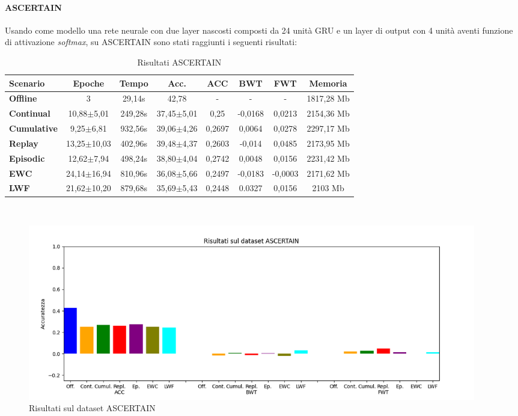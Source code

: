 \paragraph{ASCERTAIN} Usando come modello una rete neurale con due layer nascosti composti da 24 unità GRU e un layer di output con 4 unità aventi funzione di attivazione \textit{softmax}, su ASCERTAIN sono stati raggiunti i seguenti risultati:
\begin{table}[h]
\footnotesize
    \begin{tabular}{l|c|c|c|c|c|c|c}
        \textbf{Scenario} & \textbf{Epoche} & \textbf{Tempo} & \textbf{Acc.} & \textbf{ACC} & \textbf{BWT} & \textbf{FWT} & \textbf{Memoria}\\
        \hline
         \textbf{Offline} & 3 & 29,14s & 42,78 & - & - & - & 1817,28 Mb\\
        \textbf{Continual} & 10,88$\pm$5,01 & 249,28s & 37,45$\pm$5,01 & 0,25 & -0,0168 & 0,0213 & 2154,36 Mb\\
        \textbf{Cumulative} & 9,25$\pm$6,81 & 932,56s & 39,06$\pm$4,26 & 0,2697 & 0,0064 & 0,0278 & 2297,17 Mb\\
        \textbf{Replay} & 13,25$\pm$10,03 & 402,96s & 39,48$\pm$4,37 & 0,2603 & -0,014 & 0,0485 & 2173,95 Mb\\
        \textbf{Episodic} & 12,62$\pm$7,94 & 498,24s & 38,80$\pm$4,04 & 0,2742 & 0,0048 & 0,0156 & 2231,42 Mb\\
        \textbf{EWC} & 24,14$\pm$16,94 & 810,96s & 36,08$\pm$5,66 & 0,2497 & -0,0183 & -0,0003 & 2171,62 Mb\\
        \textbf{LWF} & 21,62$\pm$10,20 & 879,68s & 35,69$\pm$5,43 & 0,2448 & 0.0327 & 0,0156 & 2103 Mb\\
    \end{tabular}
    \caption{Risultati ASCERTAIN}
    \label{tab:resascertain}
\end{table}\\
\begin{figure}[h]
	\begin{center}
		\includegraphics[width=0.95\textwidth]{img/graphs/ascertain_final_metrics.png}
		\caption{Risultati sul dataset ASCERTAIN}
		\label{fig:ascertain_metrics_graph}
	\end{center}
\end{figure}\\
